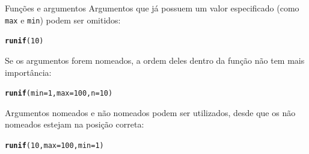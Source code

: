 \documentclass[10pt,handout]{beamer}\usepackage[]{graphicx}\usepackage[]{color}
\makeatletter
\newcommand{\hlnum}[1]{\textcolor[rgb]{0.686,0.059,0.569}{#1}}%
\newcommand{\hlstd}[1]{\textcolor[rgb]{0.345,0.345,0.345}{#1}}%
\newcommand{\hlkwc}[1]{\textcolor[rgb]{0.333,0.667,0.333}{#1}}%
\newcommand{\hlkwd}[1]{\textcolor[rgb]{0.282,0.239,0.545}{\textbf{#1}}}%
\newenvironment{kframe}{%
 \def\at@end@of@kframe{}%
 \ifinner\ifhmode%
  \def\at@end@of@kframe{\end{minipage}}%
  \begin{minipage}{\columnwidth}%
 \fi\fi%
 \def\FrameCommand##1{\hskip\@totalleftmargin \hskip-\fboxsep
 \colorbox{shadecolor}{##1}\hskip-\fboxsep
     \hskip-\linewidth \hskip-\@totalleftmargin \hskip\columnwidth}%
 \MakeFramed {\advance\hsize-\width
   \@totalleftmargin\z@ \linewidth\hsize
   \@setminipage}}%
 {\par\unskip\endMakeFramed%
 \at@end@of@kframe}
\newenvironment{knitrout}{}{} %
\makeatother
\begin{document}
\begin{frame}[fragile]{Funções e argumentos}
Argumentos que já possuem um valor especificado (como \texttt{max} e
\texttt{min}) podem ser omitidos:
\begin{knitrout}\small
{}\color{fgcolor}\begin{kframe}
\begin{alltt}
\hlkwd{runif}\hlstd{(}\hlnum{10}\hlstd{)}
\end{alltt}
\end{kframe}
\end{knitrout}

Se os argumentos forem nomeados, a ordem deles dentro da função não tem
mais importância:
\begin{knitrout}\small
{}\color{fgcolor}\begin{kframe}
\begin{alltt}
\hlkwd{runif}\hlstd{(}\hlkwc{min} \hlstd{=} \hlnum{1}\hlstd{,} \hlkwc{max} \hlstd{=} \hlnum{100}\hlstd{,} \hlkwc{n} \hlstd{=} \hlnum{10}\hlstd{)}
\end{alltt}
\end{kframe}
\end{knitrout}

Argumentos nomeados e não nomeados podem ser utilizados, desde que os
não nomeados estejam na posição correta:
\begin{knitrout}\small
{}\color{fgcolor}\begin{kframe}
\begin{alltt}
\hlkwd{runif}\hlstd{(}\hlnum{10}\hlstd{,} \hlkwc{max} \hlstd{=} \hlnum{100}\hlstd{,} \hlkwc{min} \hlstd{=} \hlnum{1}\hlstd{)}
\end{alltt}
\end{kframe}
\end{knitrout}

\end{frame}
\end{document}
